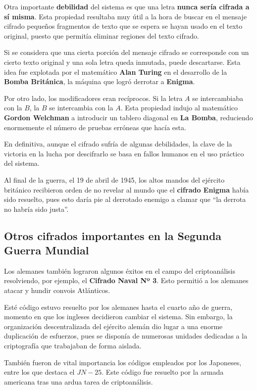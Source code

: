 \documentclass[nochap]{apuntesURJC}
\begin{document}
Otra importante \textbf{debilidad} del sistema es que una letra \textbf{nunca sería cifrada a sí misma}. Esta propiedad resultaba muy útil a la hora de buscar en el mensaje cifrado pequeños fragmentos de texto que se espera se hayan usado en el texto original, puesto que permitía eliminar regiones del texto cifrado.

Si se considera que una cierta porción del mensaje cifrado se corresponde con un cierto texto original y una sola letra queda inmutada, puede descartarse. Esta idea fue explotada por el matemático \textbf{Alan Turing} en el desarrollo de la \textbf{Bomba Británica}, la máquina que logró derrotar a \textbf{Enigma}.

Por otro lado, los modificadores eran recíprocos. Si la letra $A$ se intercambiaba con la $B$, la $B$ se intercambia con la $A$. Esta propiedad indujo al matemático \textbf{Gordon Welchman} a introducir un tablero diagonal en \textbf{La Bomba}, reduciendo enormemente el número de pruebas erróneas que hacía esta.

En definitiva, aunque el cifrado sufría de algunas debilidades, la clave de la victoria en la lucha por descifrarlo se basa en fallos humanos en el uso práctico del sistema.

Al final de la guerra, el 19 de abril de 1945, los altos mandos del ejército británico recibieron orden de no revelar al mundo que el \textbf{cifrado Enigma} había sido resuelto, pues esto daría pie al derrotado enemigo a clamar que ``la derrota no habría sido justa''.

\subsection{Otros cifrados importantes en la Segunda Guerra Mundial}
Los alemanes también lograron algunos éxitos en el campo del criptoanálisis resolviendo, por ejemplo, el \textbf{Cifrado Naval Nº 3}. Esto permitió a los alemanes atacar y hundir convois Atlánticos.

Esté código estuvo resuelto por los alemanes hasta el cuarto año de guerra, momento en que los ingleses decidieron cambiar el sistema. Sin embargo, la organización descentralizada del ejército alemán dio lugar a una enorme duplicación de esfuerzos, pues se disponía de numerosas unidades dedicadas a la criptografía que trabajaban de forma aislada.

También fueron de vital importancia los códigos empleados por los Japoneses, entre los que destaca el $JN-25$. Este código fue resuelto por la armada americana tras una ardua tarea de criptoanálisis.
\end{document}
